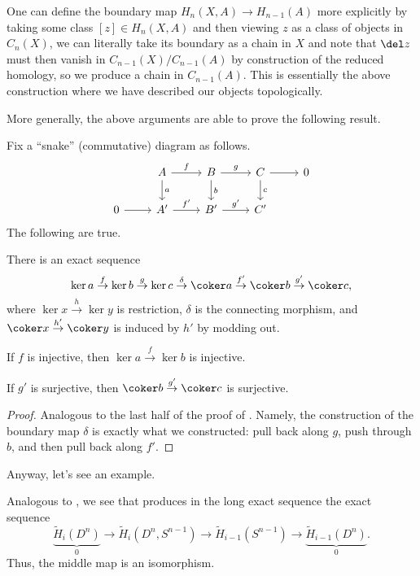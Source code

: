 \documentclass[../notes.tex]{subfiles}
\begin{document}
\begin{remark}
	One can define the boundary map $H_n(X,A)\to H_{n-1}(A)$ more explicitly by taking some class $[z]\in H_n(X,A)$ and then viewing $z$ as a class of objects in $C_n(X)$, we can literally take its boundary as a chain in $X$ and note that $\del z$ must then vanish in $C_{n-1}(X)/C_{n-1}(A)$ by construction of the reduced homology, so we produce a chain in $C_{n-1}(A)$. This is essentially the above construction where we have described our objects topologically.
\end{remark}
More generally, the above arguments are able to prove the following result.
\begin{lemma}[Snake] \label{lem:snake}
	Fix a ``snake'' (commutative) diagram as follows.
	\[\begin{tikzcd}
		& A & B & C & 0 \\
		0 & {A'} & {B'} & {C'}
		\arrow["g", from=1-3, to=1-4]
		\arrow[from=1-4, to=1-5]
		\arrow[from=2-1, to=2-2]
		\arrow["{f'}", from=2-2, to=2-3]
		\arrow["{g'}", from=2-3, to=2-4]
		\arrow["f", from=1-2, to=1-3]
		\arrow["a", from=1-2, to=2-2]
		\arrow["b", from=1-3, to=2-3]
		\arrow["c", from=1-4, to=2-4]
	\end{tikzcd}\]
	The following are true.
	\begin{listalph}
		\item There is an exact sequence
		\[\ker a\stackrel f\to\ker b\stackrel g\to\ker c\stackrel\delta\to\coker a\stackrel{f'}\to\coker b\stackrel{g'}\to\coker c,\]
		where $\ker x\stackrel h\to\ker y$ is restriction, $\delta$ is the connecting morphism, and $\coker x\stackrel{h'}\to\coker y$ is induced by $h'$ by modding out.
		\item If $f$ is injective, then $\ker a\stackrel f\to\ker b$ is injective.
		\item If $g'$ is surjective, then $\coker b\stackrel{g'}\to\coker c$ is surjective.
	\end{listalph}
\end{lemma}
\begin{proof}
	Analogous to the last half of the proof of . Namely, the construction of the boundary map $\delta$ is exactly what we constructed: pull back along $g$, push through $b$, and then pull back along $f'$.
\end{proof}
Anyway, let's see an example.
\begin{example}
	Analogous to , we see that  produces in the long exact sequence the exact sequence
	\[\underbrace{\widetilde H_i\left(D^n\right)}_0\to\widetilde H_i\left(D^n,S^{n-1}\right)\to\widetilde H_{i-1}\left(S^{n-1}\right)\to\underbrace{\widetilde H_{i-1}\left(D^n\right)}_0.\]
	Thus, the middle map is an isomorphism.
\end{example}
\end{document}
